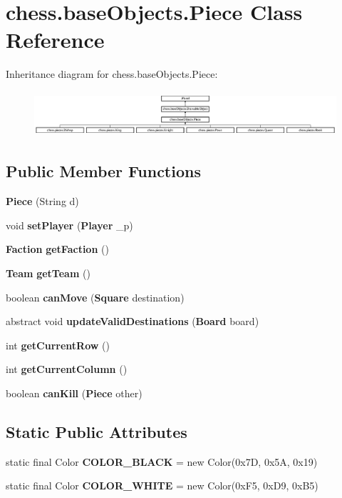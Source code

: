 \section{chess.\+base\+Objects.\+Piece Class Reference}
\label{classchess_1_1base_objects_1_1_piece}
Inheritance diagram for chess.\+base\+Objects.\+Piece\+:\begin{figure}[H]
\begin{center}
\leavevmode
\includegraphics[height=1.681682cm]{classchess_1_1base_objects_1_1_piece}
\end{center}
\end{figure}
\subsection*{Public Member Functions}
\begin{DoxyCompactItemize}
\item 
{\bf Piece} (String d)
\item 
void {\bf set\+Player} ({\bf Player} \+\_\+p)
\item 
{\bf Faction} {\bf get\+Faction} ()
\item 
{\bf Team} {\bf get\+Team} ()
\item 
boolean {\bf can\+Move} ({\bf Square} destination)
\item 
abstract void {\bf update\+Valid\+Destinations} ({\bf Board} board)
\item 
int {\bf get\+Current\+Row} ()
\item 
int {\bf get\+Current\+Column} ()
\item 
boolean {\bf can\+Kill} ({\bf Piece} other)
\end{DoxyCompactItemize}
\subsection*{Static Public Attributes}
\begin{DoxyCompactItemize}
\item 
static final Color {\bf C\+O\+L\+O\+R\+\_\+\+B\+L\+A\+C\+K} = new Color(0x7\+D, 0x5\+A, 0x19)
\item 
static final Color {\bf C\+O\+L\+O\+R\+\_\+\+W\+H\+I\+T\+E} = new Color(0x\+F5, 0x\+D9, 0x\+B5)
\end{DoxyCompactItemize}
